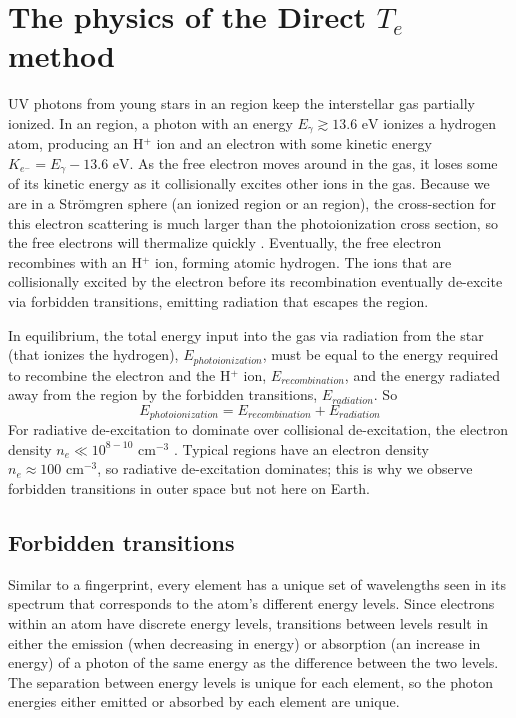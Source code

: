 \chapter[Direct method physics]{The physics of the Direct $T_e$ method}\label{sec:physics}

UV photons from young stars in an  region keep the interstellar gas 
partially ionized.  In an  region, a photon with an energy 
$E_\gamma \gtrsim 13.6\text{ eV}$ ionizes a hydrogen atom, producing an H$^+$ 
ion and an electron with some kinetic energy 
$K_{e^-} = E_\gamma - 13.6\text{ eV}$.  As the free electron moves around in the 
gas, it loses some of its kinetic energy as it collisionally excites other ions 
in the gas.  Because we are in a Str\"{o}mgren sphere (an ionized region or an 
 region), the cross-section for this electron scattering is much 
larger than the photoionization cross section, so the free electrons will 
thermalize quickly \citep{DeRobertis87}.  Eventually, the free electron 
recombines with an H$^+$ ion, forming atomic hydrogen.  The ions that are 
collisionally excited by the electron before its recombination eventually 
de-excite via forbidden transitions, emitting radiation that escapes the 
 region.

In equilibrium, the total energy input into the gas via radiation from the star 
(that ionizes the hydrogen), $E_{photoionization}$, must be equal to the energy 
required to recombine the electron and the H$^+$ ion, $E_{recombination}$, and 
the energy radiated away from the  region by the forbidden 
transitions, $E_{radiation}$.  So
\begin{equation}
    E_{photoionization} = E_{recombination} + E_{radiation}
\end{equation}
For radiative de-excitation to dominate over collisional de-excitation, the 
electron density $n_e \ll 10^{8-10}\text{ cm}^{-3}$ \citep{DeRobertis87}.  
Typical  regions have an electron density 
$n_e \approx 100\text{ cm}^{-3}$, so radiative de-excitation dominates; this is 
why we observe forbidden transitions in outer space but not here on Earth.


\section{Forbidden transitions}

Similar to a fingerprint, every element has a unique set of wavelengths seen in 
its spectrum that corresponds to the atom's different energy levels.  Since 
electrons within an atom have discrete energy levels, transitions between levels 
result in either the emission (when decreasing in energy) or absorption 
(an increase in energy) of a photon of the same energy as the difference between 
the two levels.  The separation between energy levels is unique for each 
element, so the photon energies either emitted or absorbed by each element are 
unique.


